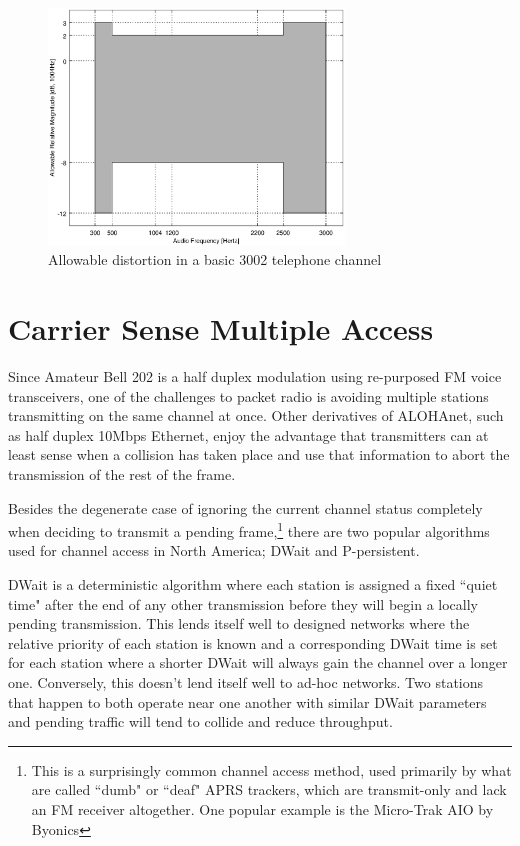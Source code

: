 \documentclass[12pt,letterpaper]{article}
\begin{document}
\begin{figure}
	\centering
	\includegraphics[width=0.7\textwidth]{src/octave/3002}
	\caption{Allowable distortion in a basic 3002 telephone channel}
	\label{fig:3002}
\end{figure}


\section{Carrier Sense Multiple Access}
\label{sec:bell202csma}

Since Amateur Bell 202 is a half duplex modulation using re-purposed 
FM voice transceivers, 
one of the challenges to packet radio is avoiding multiple stations
transmitting on the same channel at once. 
Other derivatives of ALOHAnet, 
such as half duplex 10Mbps Ethernet, 
enjoy the advantage that transmitters can
at least sense when a collision has taken place 
and use that information to abort the transmission of the rest of the frame.

Besides the degenerate case of ignoring the current channel status completely when 
deciding to transmit a pending frame,\footnote{This is a surprisingly
	common channel access method, used primarily by what are called ``dumb" or
	``deaf" APRS trackers, which are transmit-only and lack an
FM receiver altogether. One popular example is the Micro-Trak AIO by Byonics}
there are two popular algorithms used for
channel access in North America;
DWait and P-persistent.

DWait is a deterministic algorithm where each station is assigned a fixed
``quiet time" after the end of any other transmission 
before they will begin a locally pending transmission. 
This lends itself well to designed networks
where the relative priority of each station is known and a corresponding DWait time
is set for each station where a shorter DWait will 
always gain the channel over a longer one. 
Conversely, this doesn't lend itself well to ad-hoc networks.
Two stations that happen to both operate near one another 
with similar DWait parameters
and pending traffic will tend to collide and reduce throughput.
\end{document}
